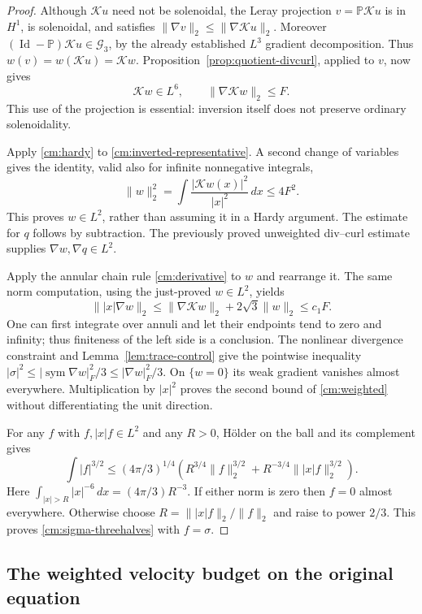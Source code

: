 \begin{proof}
Although $\mathcal Ku$ need not be solenoidal, the Leray projection
$v=\mathbb P\mathcal Ku$ is in $H^1$, is solenoidal, and satisfies
$\|\nabla v\|_2\le\|\nabla\mathcal Ku\|_2$. Moreover
$(\operatorname{Id}-\mathbb P)\mathcal Ku\in\mathcal G_3$, by the
already established $L^3$ gradient decomposition. Thus
$w(v)=w(\mathcal Ku)=\mathcal Kw$.
Proposition~\ref{prop:quotient-divcurl}, applied to $v$, now gives
\begin{equation}\label{cm:inverted-representative}
 \mathcal Kw\in L^6,\qquad \|\nabla\mathcal Kw\|_2\le F.
\end{equation}
This use of the projection is essential: inversion itself does not
preserve ordinary solenoidality.

Apply \eqref{cm:hardy} to \eqref{cm:inverted-representative}. A second
change of variables gives the identity, valid also for infinite
nonnegative integrals,
\[
 \|w\|_2^2=\int\frac{|\mathcal Kw(x)|^2}{|x|^2}\,dx\le4F^2.
\]
This proves $w\in L^2$, rather than assuming it in a Hardy argument.
The estimate for $q$ follows by subtraction. The previously proved
unweighted div--curl estimate supplies $\nabla w,\nabla q\in L^2$.

Apply the annular chain rule \eqref{cm:derivative} to $w$ and rearrange it.
The same norm computation, using the just-proved $w\in L^2$, yields
\[
 \||x|\nabla w\|_2
 \le\|\nabla\mathcal Kw\|_2+2\sqrt3\|w\|_2\le c_1F.
\]
One can first integrate over annuli and let their endpoints tend to zero
and infinity; thus finiteness of the left side is a conclusion.
The nonlinear divergence constraint and Lemma~\ref{lem:trace-control}
give the pointwise inequality
$|\sigma|^2\le|\operatorname{sym}\nabla w|_F^2/3
\le|\nabla w|_F^2/3$. On $\{w=0\}$ its weak gradient vanishes almost
everywhere. Multiplication by $|x|^2$ proves the second bound of
\eqref{cm:weighted} without differentiating the unit direction.

For any $f$ with $f,|x|f\in L^2$ and any $R>0$, H\"older on the ball and
its complement gives
\[
 \int|f|^{3/2}\le(4\pi/3)^{1/4}
  \left(R^{3/4}\|f\|_2^{3/2}
       +R^{-3/4}\||x|f\|_2^{3/2}\right).
\]
Here $\int_{|x|>R}|x|^{-6}\,dx=(4\pi/3)R^{-3}$.
If either norm is zero then $f=0$ almost everywhere. Otherwise choose
$R=\||x|f\|_2/\|f\|_2$ and raise to power $2/3$.
This proves \eqref{cm:sigma-threehalves} with $f=\sigma$.
\end{proof}

\subsection{The weighted velocity budget on the original equation}

